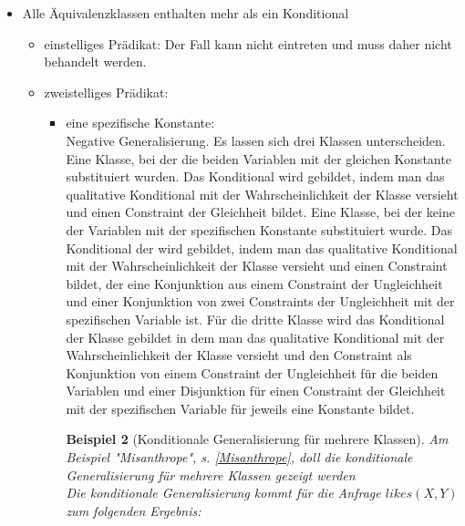 \documentclass[a4paper, 11pt]{book}
\newtheorem{Bsp}{Beispiel}[section]
\begin{document}
\begin{itemize}
\begin{itemize}
\begin{Bsp}[Konditionale Generalisierung am Beispiel]
		\end{Bsp}
		\item zweistelliges Prädikat:\\ 
		Dieser Fall ist nicht zu betrachten, da die Klassen bei zweistelligen Prädikaten jeweils mindestens zwei Elemente enthalten.
			\end{itemize}
	\item Alle Äquivalenzklassen enthalten mehr als ein Konditional
	\begin{itemize}
		\item einstelliges Prädikat: Der Fall kann nicht eintreten und muss daher nicht behandelt werden.  \\
		\item zweistelliges Prädikat:\\
		\begin{itemize}
			\item eine spezifische Konstante:\\
		Negative Generalisierung. Es lassen sich drei Klassen unterscheiden. Eine Klasse, bei der die beiden Variablen mit der gleichen Konstante substituiert wurden. Das Konditional wird gebildet, indem man das qualitative Konditional mit der Wahrscheinlichkeit der Klasse versieht und einen Constraint der Gleichheit bildet. Eine Klasse, bei der keine der Variablen mit der spezifischen Konstante substituiert wurde. Das Konditional der wird gebildet, indem man das qualitative Konditional mit der Wahrscheinlichkeit der Klasse versieht und einen Constraint bildet, der eine Konjunktion aus einem Constraint der Ungleichheit und einer Konjunktion von zwei Constraints der Ungleichheit mit der spezifischen Variable ist. Für die dritte Klasse wird das Konditional der Klasse gebildet in dem man das qualitative Konditional mit der Wahrscheinlichkeit der Klasse versieht und den Constraint als Konjunktion von einem Constraint der Ungleichheit für die beiden Variablen und einer Disjunktion für einen Constraint der Gleichheit mit der spezifischen Variable für jeweils eine Konstante bildet.\\
			\begin{Bsp}[Konditionale Generalisierung für mehrere Klassen] 
				Am Beispiel "{}Misanthrope"{}, s. \ref{Misanthrope}, doll die konditionale Generalisierung für mehrere Klassen gezeigt werden\\
				Die konditionale Generalisierung kommt für die Anfrage $ likes(X,Y) $ zum folgenden Ergebnis:\\
				

\end{Bsp}
\end{itemize}
\end{itemize}
\end{itemize}
\end{document}
